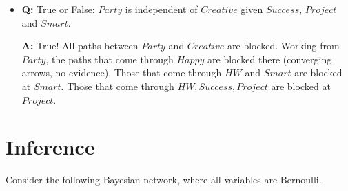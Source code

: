 \documentclass[11pt,letterpaper]{article}
\begin{document}
\begin{itemize}

\item \textbf{Q:} True or False: $Party$ is independent of $Creative$  given $Success$, $Project$
and $Smart$.

\begin{solution}
\textbf{A:} True! All paths between  $Party$ and $Creative$ are blocked. 
Working from $Party$, the paths that come through $Happy$
are blocked there (converging arrows, no evidence). Those that come through $HW$ and $Smart$ are blocked 
at $Smart$. Those that come through $HW, Success, Project$ are blocked at $Project$.
\end{solution}


\end{itemize}

\newpage
\section{Inference}
Consider the following Bayesian network, where all variables are Bernoulli.
\end{document}
